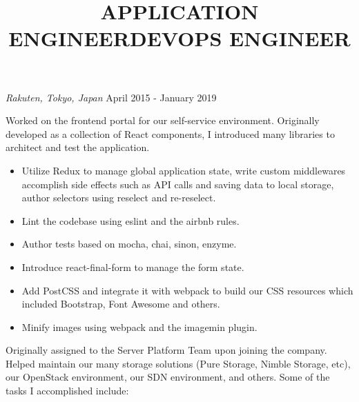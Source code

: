\documentclass{res}
\begin{document}
\begin{resume}
\vspace{8pt}
{\sl Rakuten, Tokyo, Japan} \hfill        April 2015 - January 2019
\vspace{8pt}

\title{APPLICATION ENGINEER}
\employer{}
\location{}
\begin{position}
Worked on the frontend portal for our self-service environment.
Originally developed as a collection of React components, I introduced
many libraries to architect and test the application.\\

 \begin{itemize} \itemsep -2pt %
   \item Utilize Redux to manage global application state, write custom
middlewares accomplish side effects such as API calls and saving data
to local storage, author selectors using reselect and re-reselect.
  \item Lint the codebase using eslint and the airbnb rules.
  \item Author tests based on mocha, chai, sinon, enzyme.
  \item Introduce react-final-form to manage the form state.
  \item Add PostCSS and integrate it with webpack to build our CSS
resources which included Bootstrap, Font Awesome and others.
  \item Minify images using webpack and the imagemin plugin.
 \end{itemize}
\end{position}

\title{DEVOPS ENGINEER}
\employer{}
\location{}
\begin{position}
Originally assigned to the Server Platform Team upon joining the company.
Helped maintain our many storage solutions (Pure Storage, Nimble Storage, etc),
our OpenStack environment, our SDN environment, and others.
Some of the tasks I accomplished include: \\


\end{position}
\end{resume}
\end{document}

